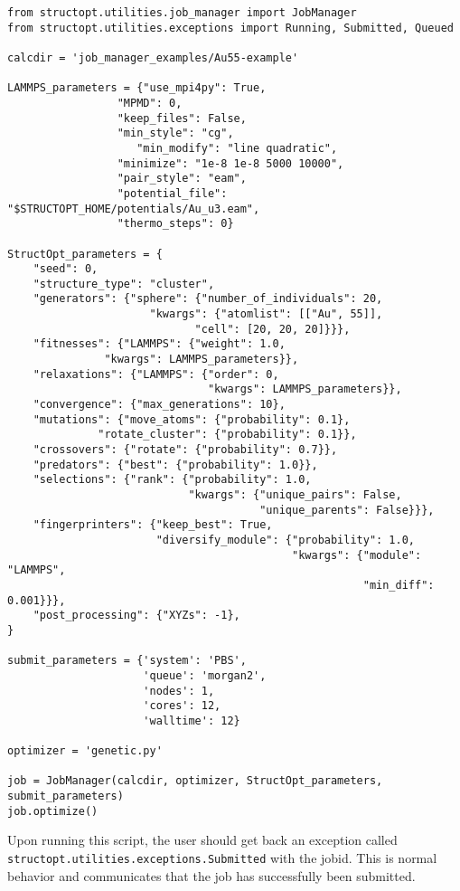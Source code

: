 \documentclass[11pt]{article}
\begin{document}
\begin{verbatim}
from structopt.utilities.job_manager import JobManager
from structopt.utilities.exceptions import Running, Submitted, Queued

calcdir = 'job_manager_examples/Au55-example'

LAMMPS_parameters = {"use_mpi4py": True,
	             "MPMD": 0,
	             "keep_files": False,
	             "min_style": "cg",
                    "min_modify": "line quadratic",
	             "minimize": "1e-8 1e-8 5000 10000",
	             "pair_style": "eam",
	             "potential_file": "$STRUCTOPT_HOME/potentials/Au_u3.eam",
	             "thermo_steps": 0}

StructOpt_parameters = {
    "seed": 0,
    "structure_type": "cluster",
    "generators": {"sphere": {"number_of_individuals": 20,
		              "kwargs": {"atomlist": [["Au", 55]],
			                 "cell": [20, 20, 20]}}},
    "fitnesses": {"LAMMPS": {"weight": 1.0,
	           "kwargs": LAMMPS_parameters}},
    "relaxations": {"LAMMPS": {"order": 0,
                               "kwargs": LAMMPS_parameters}},
    "convergence": {"max_generations": 10},
    "mutations": {"move_atoms": {"probability": 0.1},
	          "rotate_cluster": {"probability": 0.1}},
    "crossovers": {"rotate": {"probability": 0.7}},
    "predators": {"best": {"probability": 1.0}},
    "selections": {"rank": {"probability": 1.0,
                            "kwargs": {"unique_pairs": False,
                                       "unique_parents": False}}},
    "fingerprinters": {"keep_best": True,
                       "diversify_module": {"probability": 1.0,
                                            "kwargs": {"module": "LAMMPS",
                                                       "min_diff": 0.001}}},
    "post_processing": {"XYZs": -1},
}

submit_parameters = {'system': 'PBS',
                     'queue': 'morgan2',
                     'nodes': 1,
                     'cores': 12,
                     'walltime': 12}

optimizer = 'genetic.py'

job = JobManager(calcdir, optimizer, StructOpt_parameters, submit_parameters)
job.optimize()
\end{verbatim}

Upon running this script, the user should get back an exception called \texttt{structopt.utilities.exceptions.Submitted} with the jobid. This is normal behavior and communicates that the job has successfully been submitted.
\end{document}
